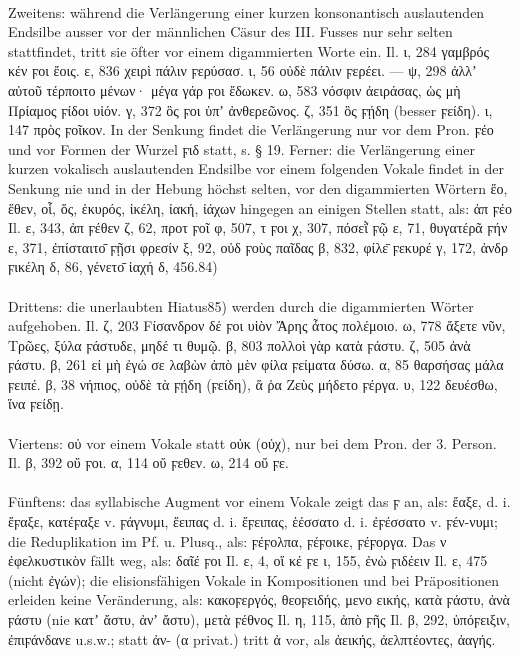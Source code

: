 \paragraph{}Zweitens: während die Verlängerung einer kurzen konsonantisch
auslautenden Endsilbe ausser vor der männlichen Cäsur des III. Fusses nur sehr
selten stattfindet, tritt sie öfter vor einem digammierten Worte ein. Il. ι, 284
γαμβρός κέν ϝοι ἔοις. ε, 836 χειρὶ πάλιν ϝερύσασ. ι, 56 οὐδὲ πάλιν ϝερέει. — ψ,
298 ἀλλʼ αὐτοῦ τέρποιτο μένων· μέγα γάρ ϝοι ἔδωκεν. ω, 583 νόσφιν ἀειράσας, ὡς
μὴ Πρίαμος ϝίδοι υἱόν. γ, 372 ὃς ϝοι ὑπʼ ἀνθερεῶνος. ζ, 351 ὃς ϝῄδη (besser
ϝείδη). ι, 147 πρὸς ϝοῖκον. In der Senkung findet die Verlängerung nur vor dem
Pron. ϝέο und vor Formen der Wurzel ϝιδ statt, s. § 19. Ferner: die Verlängerung
einer kurzen vokalisch auslautenden Endsilbe vor einem folgenden Vokale findet
in der Senkung nie und in der Hebung höchst selten, vor den digammierten Wörtern
ἕο, ἕθεν, οἷ, ὅς, ἑκυρός, ἰκέλη, ἰακή, ἰάχων hingegen an einigen Stellen statt,
als: ἀπ ϝέο Il. ε, 343, ἀπ ϝέθεν ζ, 62, προτ ϝοῖ φ, 507, τ ϝοι χ, 307, πόσεῗ ϝῷ
ε, 71, θυγατέρᾶ ϝήν ε, 371, ἐπίσταιτο̄ ϝῇσι φρεσίν ξ, 92, οὐδ ϝοὺς παῖδας β, 832,
φίλε̄ ϝεκυρέ γ, 172, ἀνδρ ϝικέλη δ, 86, γένετο̄ ἰαχή δ, 456.84)

\paragraph{}Drittens: die unerlaubten Hiatus85) werden durch die digammierten
Wörter aufgehoben. Il. ζ, 203 Fίσανδρον δέ ϝοι υἱὸν Ἄρης ἆτος πολέμοιο. ω, 778
ἄξετε νῦν, Τρῶες, ξύλα ϝάστυδε, μηδέ τι θυμῷ. β, 803 πολλοὶ γὰρ κατὰ ϝάστυ. ζ,
505 ἀνὰ ϝάστυ. β, 261 εἰ μὴ ἐγώ σε λαβὼν ἀπὸ μὲν φίλα ϝείματα δύσω. α, 85
θαρσήσας μάλα ϝειπέ. β, 38 νήπιος, οὐδὲ τὰ ϝῄδη (ϝείδη), ἅ ῥα Ζεὺς μήδετο ϝέργα.
υ, 122 δευέσθω, ἵνα ϝείδῃ. 
\paragraph{}Viertens: οὐ vor einem Vokale statt οὐκ
(οὐχ), nur bei dem Pron. der 3. Person. Il. β, 392 οὔ ϝοι. α, 114 οὔ ϝεθεν. ω,
214 οὔ ϝε. 

\paragraph{} Fünftens: das syllabische Augment vor einem Vokale zeigt das ϝ an,
als: ἔαξε, d. i. ἔϝαξε, κατέϝαξε v. ϝάγνυμι, ἔειπας d. i. ἔϝειπας, ἑέσσατο d. i.
ἐϝέσσατο v. ϝέν-νυμι; die Reduplikation im Pf. u. Plusq., als: ϝέϝολπα, ϝέϝοικε,
ϝέϝοργα. Das ν ἐφελκυστικὸν fällt weg, als: δαῖέ ϝοι Il. ε, 4, οἵ κέ ϝε ι, 155,
ἐνὼ ϝιδέειν Il. ε, 475 (nicht ἐγών); die elisionsfähigen Vokale in Kompositionen
und bei Präpositionen erleiden keine Veränderung, als: κακοϝεργός, θεοϝειδής,
μενο εικής, κατὰ ϝάστυ, ἀνὰ ϝάστυ (nie κατʼ ἄστυ, ἀνʼ ἄστυ), μετὰ ϝέθνος Il. η,
115, ἀπὸ ϝῆς Il. β, 292, ὑπόϝειξιν, ἐπιϝάνδανε u.s.w.; statt ἀν- (α privat.)
tritt ἀ vor, als ἀεικής, ἀελπτέοντες, ἀαγής. 

